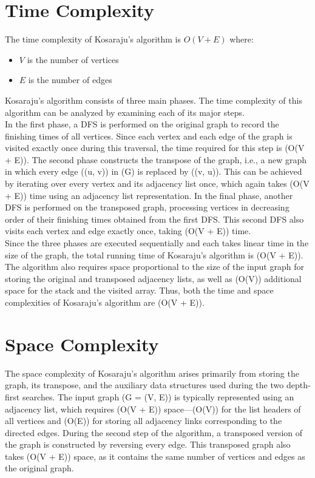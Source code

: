 \documentclass{book}
\theoremstyle{definition}
\begin{document}
\section{Time Complexity}

The time complexity of Kosaraju's algorithm is $O(V + E)$ where:
\begin{itemize}
    \item $V$ is the number of vertices
    \item $E$ is the number of edges
\end{itemize}
Kosaraju's algorithm consists of three main phases. The time complexity of this algorithm can be analyzed by examining each of its major steps.\\

In the first phase, a DFS is performed on the original graph to record the finishing times of all vertices. Since each vertex and each edge of the graph is visited exactly once during this traversal, the time required for this step is (O(V + E)). The second phase constructs the transpose of the graph, i.e., a new graph in which every edge ((u, v)) in (G) is replaced by ((v, u)). This can be achieved by iterating over every vertex and its adjacency list once, which again takes (O(V + E)) time using an adjacency list representation. In the final phase, another DFS is performed on the transposed graph, processing vertices in decreasing order of their finishing times obtained from the first DFS. This second DFS also visits each vertex and edge exactly once, taking (O(V + E)) time.\\

Since the three phases are executed sequentially and each takes linear time in the size of the graph, the total running time of Kosaraju’s algorithm is (O(V + E)). The algorithm also requires space proportional to the size of the input graph for storing the original and transposed adjacency lists, as well as (O(V)) additional space for the stack and the visited array. Thus, both the time and space complexities of Kosaraju’s algorithm are (O(V + E)).


\section{Space Complexity}
The space complexity of Kosaraju’s algorithm arises primarily from storing the graph, its transpose, and the auxiliary data structures used during the two depth-first searches. The input graph (G = (V, E)) is typically represented using an adjacency list, which requires (O(V + E)) space—(O(V)) for the list headers of all vertices and (O(E))  for storing all adjacency links corresponding to the directed edges. During the second step of the algorithm, a transposed version of the graph is constructed by reversing every edge. This transposed graph also takes (O(V + E)) space, as it contains the same number of vertices and edges as the original graph.\\
\end{document}
